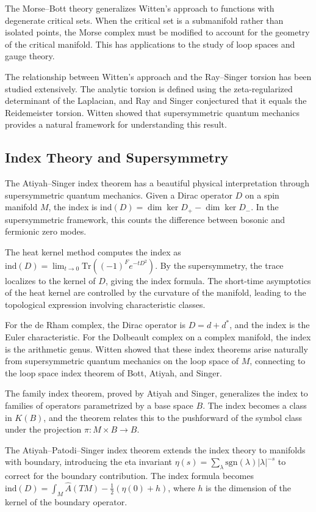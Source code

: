 The Morse--Bott theory generalizes Witten's approach to functions with degenerate critical sets. When the critical set is a submanifold rather than isolated points, the Morse complex must be modified to account for the geometry of the critical manifold. This has applications to the study of loop spaces and gauge theory.

The relationship between Witten's approach and the Ray--Singer torsion has been studied extensively. The analytic torsion is defined using the zeta-regularized determinant of the Laplacian, and Ray and Singer conjectured that it equals the Reidemeister torsion. Witten showed that supersymmetric quantum mechanics provides a natural framework for understanding this result.

\subsection{Index Theory and Supersymmetry}

The Atiyah--Singer index theorem has a beautiful physical interpretation through supersymmetric quantum mechanics. Given a Dirac operator $D$ on a spin manifold $M$, the index is $\text{ind}(D) = \dim \ker D_+ - \dim \ker D_-$. In the supersymmetric framework, this counts the difference between bosonic and fermionic zero modes.

The heat kernel method computes the index as $\text{ind}(D) = \lim_{t \to 0} \text{Tr}((-1)^F e^{-tD^2})$. By the supersymmetry, the trace localizes to the kernel of $D$, giving the index formula. The short-time asymptotics of the heat kernel are controlled by the curvature of the manifold, leading to the topological expression involving characteristic classes.

For the de Rham complex, the Dirac operator is $D = d + d^*$, and the index is the Euler characteristic. For the Dolbeault complex on a complex manifold, the index is the arithmetic genus. Witten showed that these index theorems arise naturally from supersymmetric quantum mechanics on the loop space of $M$, connecting to the loop space index theorem of Bott, Atiyah, and Singer.

The family index theorem, proved by Atiyah and Singer, generalizes the index to families of operators parametrized by a base space $B$. The index becomes a class in $K(B)$, and the theorem relates this to the pushforward of the symbol class under the projection $\pi: M \times B \to B$.

The Atiyah--Patodi--Singer index theorem extends the index theory to manifolds with boundary, introducing the eta invariant $\eta(s) = \sum_\lambda \text{sgn}(\lambda)|\lambda|^{-s}$ to correct for the boundary contribution. The index formula becomes $\text{ind}(D) = \int_M \widehat{A}(TM) - \frac{1}{2}(\eta(0) + h)$, where $h$ is the dimension of the kernel of the boundary operator.

